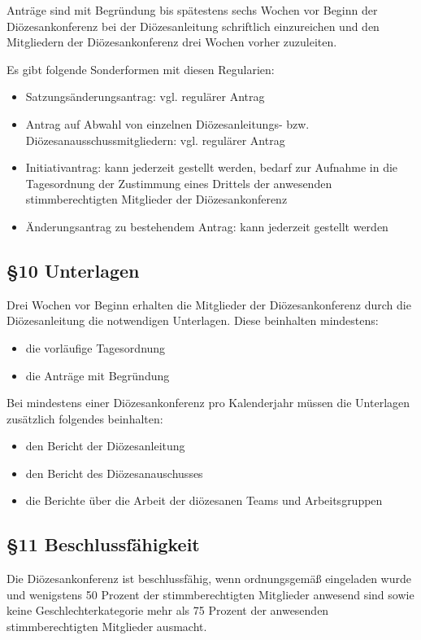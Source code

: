 \documentclass[12pt]{report}
\begin{document}
\begin{justify}
Anträge sind mit Begründung bis spätestens sechs Wochen vor Beginn der Diözesankonferenz bei der Diözesanleitung
schriftlich einzureichen und den Mitgliedern der Diözesankonferenz drei Wochen vorher zuzuleiten.

Es gibt folgende Sonderformen mit diesen Regularien:
\begin{itemize}
  \item Satzungsänderungsantrag: vgl. regulärer Antrag
  \item Antrag auf Abwahl von einzelnen Diözesanleitungs- bzw. Diözesanausschussmitgliedern:
        vgl. regulärer Antrag
  \item Initiativantrag: kann jederzeit gestellt werden, bedarf zur Aufnahme in die Tagesordnung der Zustimmung
        eines Drittels der anwesenden stimmberechtigten Mitglieder der Diözesankonferenz
  \item Änderungsantrag zu bestehendem Antrag: kann jederzeit gestellt werden
\end{itemize}

\subsection*{§10 Unterlagen}
Drei Wochen vor Beginn erhalten die Mitglieder der Diözesankonferenz durch die Diözesanleitung die notwendigen
Unterlagen. Diese beinhalten mindestens:
\begin{itemize}
  \item die vorläufige Tagesordnung
  \item die Anträge mit Begründung
\end{itemize}

Bei mindestens einer Diözesankonferenz pro Kalenderjahr müssen die Unterlagen
zusätzlich folgendes beinhalten:
\begin{itemize}
  \item den Bericht der Diözesanleitung
  \item den Bericht des Diözesanauschusses
  \item die Berichte über die Arbeit der diözesanen Teams und Arbeitsgruppen
\end{itemize}

\subsection*{§11 Beschlussfähigkeit}
Die Diözesankonferenz ist beschlussfähig, wenn ordnungsgemäß eingeladen wurde und wenigstens 50 Prozent
der stimmberechtigten Mitglieder anwesend sind sowie keine Geschlechterkategorie mehr als 75 Prozent der anwesenden stimmberechtigten Mitglieder ausmacht.


\end{justify}
\end{document}
